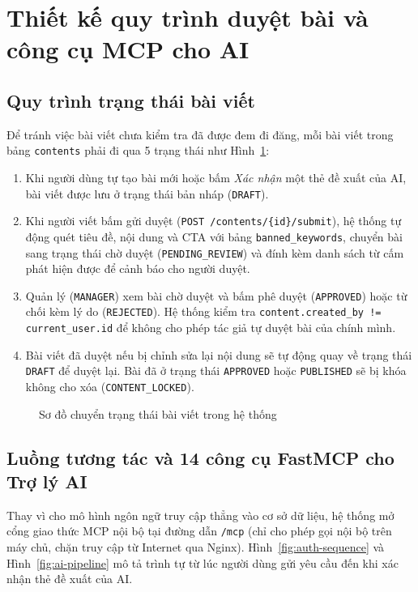 \section{Thiết kế quy trình duyệt bài và công cụ MCP cho AI}

\subsection{Quy trình trạng thái bài viết}

Để tránh việc bài viết chưa kiểm tra đã được đem đi đăng, mỗi bài viết trong bảng \texttt{contents} phải đi qua 5 trạng thái như Hình~\ref{fig:content-state}:
\begin{enumerate}[noitemsep,topsep=2pt]
 \item Khi người dùng tự tạo bài mới hoặc bấm \textit{Xác nhận} một thẻ đề xuất của AI, bài viết được lưu ở trạng thái bản nháp (\texttt{DRAFT}).
 \item Khi người viết bấm gửi duyệt (\texttt{POST /contents/\{id\}/submit}), hệ thống tự động quét tiêu đề, nội dung và CTA với bảng \texttt{banned\_keywords}, chuyển bài sang trạng thái chờ duyệt (\texttt{PENDING\_REVIEW}) và đính kèm danh sách từ cấm phát hiện được để cảnh báo cho người duyệt.
 \item Quản lý (\texttt{MANAGER}) xem bài chờ duyệt và bấm phê duyệt (\texttt{APPROVED}) hoặc từ chối kèm lý do (\texttt{REJECTED}). Hệ thống kiểm tra \texttt{content.created\_by != current\_user.id} để không cho phép tác giả tự duyệt bài của chính mình.
 \item Bài viết đã duyệt nếu bị chỉnh sửa lại nội dung sẽ tự động quay về trạng thái \texttt{DRAFT} để duyệt lại. Bài đã ở trạng thái \texttt{APPROVED} hoặc \texttt{PUBLISHED} sẽ bị khóa không cho xóa (\texttt{CONTENT\_LOCKED}).
\end{enumerate}

\begin{figure}[!htbp]
\centering

\caption{Sơ đồ chuyển trạng thái bài viết trong hệ thống}
\label{fig:content-state}
\end{figure}

\subsection{Luồng tương tác và 14 công cụ FastMCP cho Trợ lý AI}

Thay vì cho mô hình ngôn ngữ truy cập thẳng vào cơ sở dữ liệu, hệ thống mở cổng giao thức MCP nội bộ tại đường dẫn \texttt{/mcp} (chỉ cho phép gọi nội bộ trên máy chủ, chặn truy cập từ Internet qua Nginx). Hình~\ref{fig:auth-sequence} và Hình~\ref{fig:ai-pipeline} mô tả trình tự từ lúc người dùng gửi yêu cầu đến khi xác nhận thẻ đề xuất của AI.

